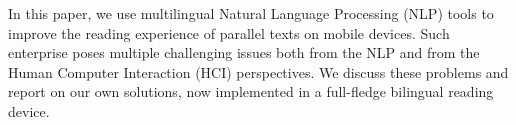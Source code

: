 In this paper, we use multilingual Natural Language Processing (NLP) tools to improve the reading experience of parallel texts on mobile devices. Such enterprise poses multiple challenging issues both from the NLP and from the Human Computer Interaction (HCI) perspectives. We discuss these problems and report on our own solutions, now implemented in a full-fledge bilingual reading device.
